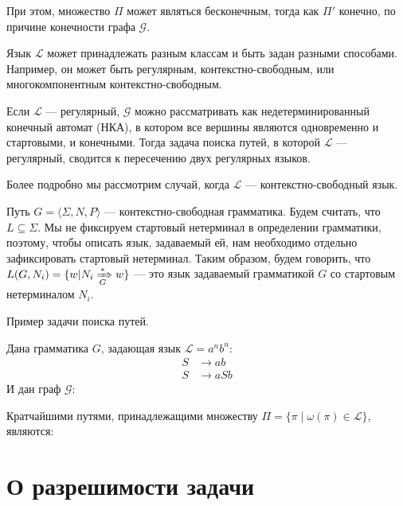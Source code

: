 При этом, множество $\Pi$ может являться бесконечным, тогда как $\Pi'$ конечно, по причине конечности графа $\mathcal{G}$.

Язык $\mathcal{L}$ может принадлежать разным классам и быть задан разными способами. Например, он может быть регулярным, контекстно-свободным, или многокомпонентным контекстно-свободным.

Если $\mathcal{L}$ --- регулярный, $\mathcal{G}$ можно рассматривать как недетерминированный конечный автомат (НКА), в котором все вершины являются одновременно и стартовыми, и конечными.
Тогда задача поиска путей, в которой $\mathcal{L}$ --- регулярный, сводится к пересечению двух регулярных языков.

Более подробно мы рассмотрим случай, когда $\mathcal{L}$ --- контекстно-свободный язык.

Путь $G = \langle \Sigma, N, P \rangle$ --- контекстно-свободная грамматика.
Будем считать, что $L \subseteq \Sigma$.
Мы не фиксируем стартовый нетерминал в определении грамматики, поэтому, чтобы описать язык, задаваемый ей, нам необходимо отдельно зафиксировать стартовый нетерминал.
Таким образом, будем говорить, что $L(G,N_i) = \{ w | N_i \xRightarrow[G]{*} w  \}$ --- это язык задаваемый грамматикой $G$ со стартовым нетерминалом $N_i$.

\begin{example}
    Пример задачи поиска путей.

    Дана грамматика $G$, задающая язык $\mathcal{L} = a^n b^n$:
    \begin{align*}
    S   &\to a b \\
    S   &\to a S b
    \end{align*}
    И дан граф $\mathcal{G}:$
    \begin{center}
      
    \end{center}

    Кратчайшими путями, принадлежащими множеству $\Pi = \{\pi \mid \omega(\pi) \in \mathcal{L}\}$, являются:

    \begin{center}
        
    \end{center}

    \begin{center}
        
    \end{center}

\end{example}


\section{О разрешимости задачи}

